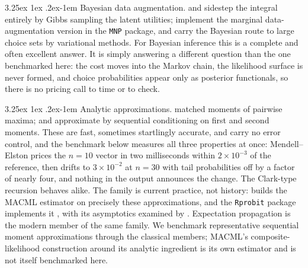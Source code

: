 \documentclass[11pt]{article}
\makeatletter
\renewcommand\paragraph{\@startsection{paragraph}{4}{\z@}%
  {3.25ex \@plus1ex \@minus.2ex}{-1em}%
  {\normalfont\normalsize\itshape}}
\makeatother
\begin{document}
\paragraph{Bayesian data augmentation.} \citet{albert1993} and
\citet{mcculloch1994} sidestep the integral entirely by Gibbs sampling the latent
utilities; \citet{imai2005} implement the marginal data-augmentation version
in the \texttt{MNP} package, and \citet{loaizamaya2022} carry the Bayesian
route to large choice sets by variational methods. For Bayesian inference
this is a complete and often excellent answer. It is simply answering a different question than the
one benchmarked here: the cost moves into the Markov chain, the likelihood
surface is never formed, and choice probabilities appear only as posterior
functionals, so there is no pricing call to time or to check.

\paragraph{Analytic approximations.} \citet{clark1961} matched moments of
pairwise maxima; \citet{mendell1974} and \citet{solow1990} approximate by
sequential conditioning on first and second moments. These are fast, sometimes
startlingly accurate, and carry no error control, and the benchmark below
measures all three properties at once: Mendell--Elston prices the $n=10$ vector
in two milliseconds within $2\times10^{-3}$ of the reference, then drifts to
$3\times10^{-2}$ at $n=30$ with tail probabilities off by a factor of nearly
four, and nothing in the output announces the change. The Clark-type recursion
behaves alike. The family is current practice, not history:
\citet{bhat2011} builds the MACML estimator on precisely these
approximations, and the \texttt{Rprobit} package implements it
\citep{bauerRprobit}, with its asymptotics examined by
\citet{batram2019}. Expectation propagation
is the modern member of the same family. We benchmark representative
sequential moment approximations through the classical members; MACML's
composite-likelihood construction around its analytic ingredient is its own
estimator and is not itself benchmarked here.
\end{document}
